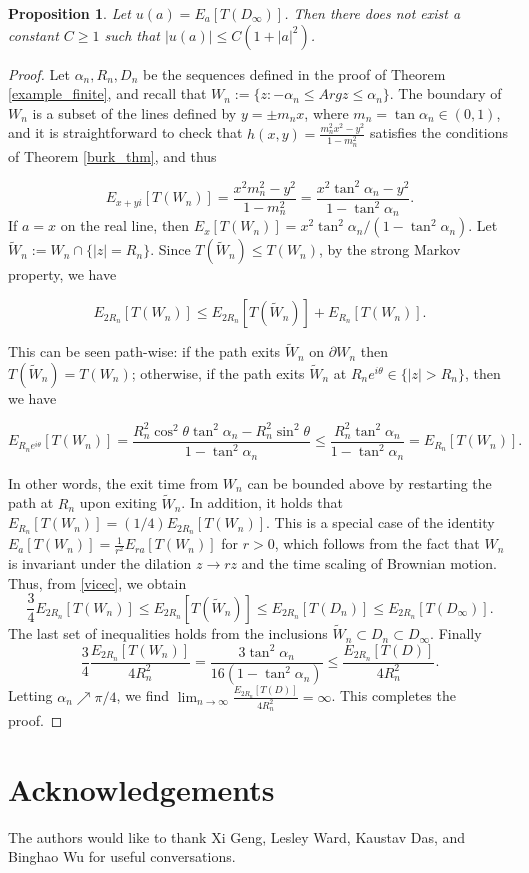 \documentclass[a4paper, oneside, 12pt]{amsart}
\newcommand{\fr}{\frac}
\newtheorem{proposition}{Proposition}[section]
\begin{document}
\begin{proposition}
    Let $u(a) = E_a[T(D_\infty)]$. Then there does not exist a constant $C\geq1$ such that $|u(a)| \leq C(1+|a|^2)$.
\end{proposition}
\begin{proof}
Let $\alpha_n, R_n, D_n$ be the sequences defined in the proof of Theorem 
\ref{example_finite}, and recall that
$W_n:=\{z:-\alpha_n\leq Argz \leq \alpha_n\}$. The boundary of $W_n$ is a subset of the lines defined by $y=\pm m_n x$, where $m_n = \tan \alpha_n \in (0,1)$, and it is straightforward to check that $h(x,y) = \frac{m_n^2 x^2 - y^2}{1-m_n^2}$ satisfies the conditions of Theorem \ref{burk_thm}, and thus 

$$
 E_{x+yi}[T(W_n)] = \fr{x^2 m^2_n - y^2}{1-m^2_n} = \fr{x^2\tan^2\alpha_n - y^2}{1-\tan^2\alpha_n}.
$$
If $a = x$ on the real line, then $ E_{x}[T(W_n)] =x^2\tan^2\alpha_n/(1-\tan^2\alpha_n) $. 
Let $\tilde W_n  := W_n \cap \{|z| = R_n\}$. Since $T(\tilde W_n) \leq T(W_n)$, by the strong Markov property, we have

\begin{equation} \label{vicec}
    E_{2R_n}[T(W_n)] \leq E_{2R_n}[T(\tilde W_n)] + E_{R_n}[T(W_n)].    
\end{equation}

This can be seen path-wise: if the path exits $\tilde W_n$ on $\partial W_n$ then $T(\tilde W_n) = T(W_n)$; otherwise, if the path exits $\tilde W_n$ at $R_n e^{i \theta} \in \{|z| > R_n\}$, then we have 

$$
E_{R_ne^{i \theta}}[T(W_n)] = \fr{R_n^2\cos^2\theta \tan^2\alpha_n - R_n^2 \sin^2 \theta}{1-\tan^2\alpha_n} \leq \fr{R_n^2\tan^2\alpha_n}{1-\tan^2\alpha_n} = E_{R_n}[T(W_n)].
$$ 

In other words, the exit time from
$W_n$ can be bounded above by restarting the path at $R_n$ upon exiting $\tilde W_n$. In addition, it holds that $E_{R_n}[T(W_n)] = (1/4) E_{2R_n}[T(W_n)]$. This is a special case of the identity $E_{a}[T(W_n)] = \frac{1}{r^2}E_{ra}[T(W_n)]$ for $r>0$, which follows from the fact that $W_n$ is invariant under the dilation $z \to rz$ and the time scaling of Brownian motion. Thus, from \eqref{vicec}, we obtain
$$
    \fr{3}{4}E_{2R_n}[T(W_n)] \leq E_{2R_n}[T(\tilde W_n)] \leq E_{2R_n}[T(D_n)]\leq E_{2R_n}[T(D_\infty)].
$$
The last set of inequalities holds from the inclusions $\tilde W_n \subset D_n \subset D_{\infty}$. Finally
$$
    \fr{3}{4} \fr{E_{2R_n}[T(W_n)]}{4R_n^2} = \fr{3\tan^2\alpha_n}{16(1-\tan^2\alpha_n)} \leq \fr{E_{2R_n}[T(D)]}{4R_n^2}.
$$
Letting $\alpha_n\nearrow\pi/4$, we find $\lim_{n\to\infty}\fr{E_{2R_n}[T(D)]}{4R_n^2} = \infty$. This completes the proof.
\end{proof}

\section{Acknowledgements}

The authors would like to thank Xi Geng, Lesley Ward, Kaustav Das, and Binghao Wu for useful conversations.



\end{document}
